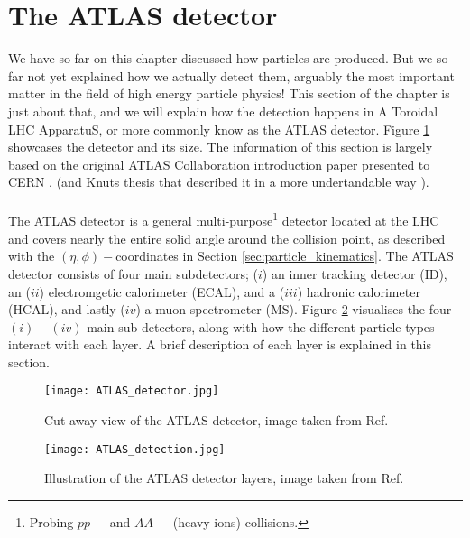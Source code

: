 \documentclass[14pt, a4paper]{book}
\begin{document}
\section{The ATLAS detector}
We have so far on this chapter discussed how particles are produced. But we so far not yet explained how we actually detect them, arguably the most important matter in the field of high energy particle physics!
This section of the chapter is just about that, and we will explain how the detection happens in A Toroidal LHC ApparatuS, or more commonly know as the ATLAS detector. Figure \ref{fig:ATLAS_detector} showcases 
the detector and its size. The information of this section is largely based on the original ATLAS Collaboration introduction paper presented to CERN 
\cite{Aad:1129811}. (and Knuts thesis \cite{KNUT_VADLA} that described it in a more undertandable way ). \\
\\The ATLAS detector is a general multi-purpose\footnote{Probing $pp-$ and $AA-$ (heavy ions) collisions.} detector located at the LHC and covers nearly the entire solid angle 
around the collision point, as described with the $(\eta,\phi)-$coordinates in Section \ref{sec:particle_kinematics}. The ATLAS detector consists of four main subdetectors; ($i$) an inner tracking detector (ID), 
an ($ii$) electromgetic calorimeter (ECAL), and a ($iii$) hadronic calorimeter (HCAL), and lastly ($iv$) a muon spectrometer (MS). Figure \ref{fig:ATLAS_layers} visualises the four $(i)-(iv)$ main sub-detectors, 
along with how the different particle types interact with each layer. A brief description of each layer is explained in this section.
\begin{figure}[!ht]
	\centering
    \texttt{[image: ATLAS\_detector.jpg]}
    \caption[The ATLAS detector]{Cut-away view of the ATLAS detector, image taken from Ref. \cite{Aad:1129811}}\label{fig:ATLAS_detector}
\end{figure}
\begin{figure}[!ht]
	\centering
    \texttt{[image: ATLAS\_detection.jpg]}
    \caption[Illustration of the ATLAS detector layers]{Illustration of the ATLAS detector layers, image taken from Ref. \cite{Pequenao:1505342}}\label{fig:ATLAS_layers}
\end{figure}
\end{document}
